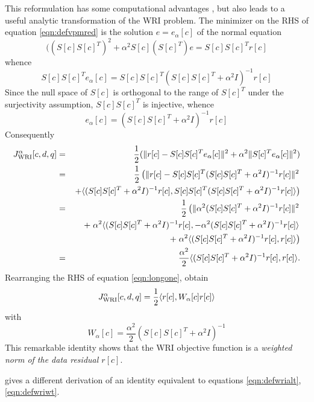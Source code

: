 This reformulation has some computational advantages \cite[]{WangYingst:SEG16,Herrmann:SEG19}, but also leads to a useful analytic transformation of the WRI problem. The minimizer on the RHS of equation \ref{eqn:defvpmred} is the solution $e=e_{\alpha}[c]$ of the normal equation
\[
 ( (S[c]S[c]^T)^2 + \alpha^2S[c](S[c]^T)e = S[c]S[c]^Tr[c]
\]
whence
\[
  S[c]S[c]^Te_{\alpha}[c] = S[c]S[c]^T(S[c]S[c]^T+\alpha^2I)^{-1}r[c]
\]
Since the null space of $S[c]$ is orthogonal to the range of $S[c]^T$
under the surjectivity assumption, $S[c]S[c]^T$ is injective, whence
\begin{equation}
  \label{eqn:norsol}
  e_{\alpha}[c]=(S[c]S[c]^T+\alpha^2I)^{-1}r[c]
\end{equation}
Consequently
\begin{eqnarray}
  J_{\rm WRI}^{\alpha}[c,d,q] &=&
  \frac{1}{2}(\|r[c]-S[c]S[c]^Te_{\alpha}[c]\|^2+\alpha^2\|S[c]^Te_{\alpha}[c]\|^2)\nonumber\\
  &=& \frac{1}{2}\left(\|r[c]-S[c]S[c]^T
    (S[c]S[c]^T+\alpha^2I)^{-1}r[c]\|^2\right. \nonumber\\
  & &
  \left.+\langle (S[c]S[c]^T+\alpha^2I)^{-1}r[c],
  S[c]S[c]^T (S[c]S[c]^T+\alpha^2I)^{-1}r[c]
  \rangle\right)  \nonumber\\
  &=&\frac{1}{2}\left(\|\alpha^2 (S[c]S[c]^T+\alpha^2I)^{-1}r[c]\|^2\right. \nonumber\\
  & &
  + \left. \alpha^2 \langle (S[c]S[c]^T+\alpha^2I)^{-1}r[c],
  - \alpha^2 (S[c]S[c]^T+\alpha^2I)^{-1}r[c]\rangle\right. \nonumber\\
  & &  + \left. \alpha^2\langle (S[c]S[c]^T+\alpha^2I)^{-1}r[c],r[c]\rangle\right) \nonumber\\
  &=&  \frac{\alpha^2}{2}\langle
      (S[c]S[c]^T+\alpha^2I)^{-1}r[c],r[c]\rangle.
   \label{eqn:longone}
\end{eqnarray}
Rearranging the RHS of equation \ref{eqn:longone}, obtain
\begin{equation}
  \label{eqn:defwrialt}
  J_{\rm WRI}^{\alpha}[c,d,q] = \frac{1}{2}\langle r[c], W_{\alpha}[c] r[c]\rangle
\end{equation}
with
\begin{equation}
  \label{eqn:defwriwt}
  W_{\alpha}[c] = \frac{\alpha^2}{2}(S[c]S[c]^T+\alpha^2I)^{-1}
\end{equation}
This remarkable identity shows that the WRI objective function is a
{\em weighted norm of the data residual $r[c]$}.

\cite{Leeuwen2019note} gives a different derivation of an identity
equivalent to equations \ref{eqn:defwrialt}, \ref{eqn:defwriwt}.

